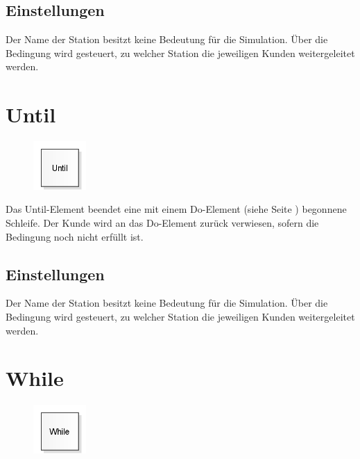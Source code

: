 \subsection*{Einstellungen}

Der Name der Station besitzt keine Bedeutung für die Simulation. Über die Bedingung
wird gesteuert, zu welcher Station die jeweiligen Kunden weitergeleitet werden.


\section{Until}
\label{ref:ModelElementLogicUntil}

\begin{figure}
\vspace{-22pt}
\includegraphics[width=2cm]{imageModelElementLogicUntil.png}
\vspace{-22pt}
\end{figure}

Das Until-Element beendet eine mit einem
Do-Element (siehe Seite \pageref{ref:ModelElementLogicDo}) begonnene
Schleife. Der Kunde wird an das Do-Element zurück verwiesen,
sofern die Bedingung noch nicht erfüllt ist.

\subsection*{Einstellungen}

Der Name der Station besitzt keine Bedeutung für die Simulation.
Über die Bedingung wird gesteuert, zu welcher Station die jeweiligen Kunden weitergeleitet werden.


\section{While}
\label{ref:ModelElementLogicWhile}

\begin{figure}
\vspace{-22pt}
\includegraphics[width=2cm]{imageModelElementLogicWhile.png}
\vspace{-22pt}
\end{figure}


